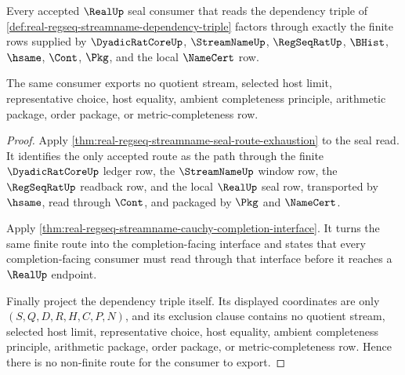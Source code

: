 \begin{theorem}
\label{thm:real-seal-regseq-streamname-dependency-exhaustion}
Every accepted $\RealUp$ seal consumer that reads the dependency triple of
\autoref{def:real-regseq-streamname-dependency-triple} factors through
exactly the finite rows supplied by $\DyadicRatCoreUp$, $\StreamNameUp$,
$\RegSeqRatUp$, $\BHist$, $\hsame$, $\Cont$, $\Pkg$, and the local
$\NameCert$ row.

The same consumer exports no quotient stream, selected host limit,
representative choice, host equality, ambient completeness principle,
arithmetic package, order package, or metric-completeness row.
\end{theorem}
\begin{proof}
Apply \autoref{thm:real-regseq-streamname-seal-route-exhaustion} to the seal
read. It identifies the only accepted route as the path through the finite
$\DyadicRatCoreUp$ ledger row, the $\StreamNameUp$ window row, the
$\RegSeqRatUp$ readback row, and the local $\RealUp$ seal row, transported by
$\hsame$, read through $\Cont$, and packaged by $\Pkg$ and $\NameCert$.

Apply \autoref{thm:real-regseq-streamname-cauchy-completion-interface}. It
turns the same finite route into the completion-facing interface and states
that every completion-facing consumer must read through that interface before
it reaches a $\RealUp$ endpoint.

Finally project the dependency triple itself. Its displayed coordinates are
only $(S,Q,D,R,H,C,P,N)$, and its exclusion clause contains no quotient
stream, selected host limit, representative choice, host equality, ambient
completeness principle, arithmetic package, order package, or
metric-completeness row. Hence there is no non-finite route for the consumer
to export.
\end{proof}


